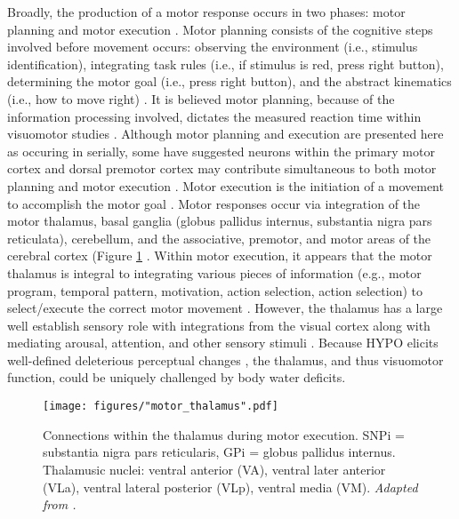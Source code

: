 Broadly, the production of a motor response occurs in two phases: motor planning and motor execution \cite{crammond_prior_2000}. Motor planning consists of the cognitive steps involved before movement occurs: observing the environment (i.e., stimulus identification), integrating task rules (i.e., if stimulus is red, press right button), determining the motor goal (i.e., press right button), and the abstract kinematics (i.e., how to move right) \cite{wong_motor_2015}. It is believed motor planning, because of the information processing involved, dictates the measured reaction time within visuomotor studies \cite{wong_motor_2015}. Although motor planning and execution are presented here as occuring in serially, some have suggested neurons within the primary motor cortex and dorsal premotor cortex may contribute simultaneous to both motor planning and motor execution \cite{crammond_prior_2000}. Motor execution is the initiation of a movement to accomplish the motor goal \cite{kaufman_roles_2013}. Motor responses occur via integration of the motor thalamus, basal ganglia (globus pallidus internus, substantia nigra pars reticulata), cerebellum, and the associative, premotor, and motor areas of the cerebral cortex (Figure \ref{fig:motor_thalamus} \cite{rizzolatti_organization_1998,bosch-bouju_motor_2013}. Within motor execution, it appears that the motor thalamus is integral to integrating various pieces of information (e.g., motor program, temporal pattern, motivation, action selection, action selection) to select/execute the correct motor movement \cite{bosch-bouju_motor_2013}. However, the thalamus has a large well establish sensory role with integrations from the visual cortex along with mediating arousal, attention, and other sensory stimuli \cite{nakajima_thalamic_2017}. Because HYPO elicits well-defined deleterious perceptual changes \cite{engell_thirst_1987,armstrong_mild_2012,lieberman_severe_2005}, the thalamus, and thus visuomotor function, could be uniquely challenged by body water deficits. 

\begin{figure}
	\centering
	\texttt{[image: figures/"motor\_thalamus".pdf]}
	\caption{Connections within the thalamus during motor execution. SNPi = substantia nigra pars reticularis, GPi = globus pallidus internus. Thalamusic nuclei: ventral anterior (VA), ventral later anterior (VLa), ventral lateral posterior (VLp), ventral media (VM). \textit{Adapted from \cite{bosch-bouju_motor_2013}.}}
	\label{fig:motor_thalamus}
\end{figure}

